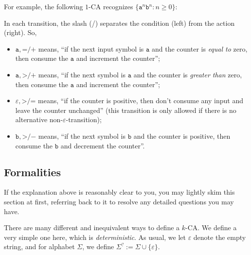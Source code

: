 \documentclass[11pt]{article}
\newcommand{\emptystr}{\varepsilon}
\renewcommand{\t}[1]{\texttt{#1}}
\newcommand{\syg}{\mathord{>}}
\newcommand{\sye}{\mathord{=}}
\newcommand{\syp}{\mathord{+}}
\newcommand{\sym}{\mathord{-}}
\theoremstyle{definition}
\begin{document}
For example, the following $1$-CA recognizes $\{\t a^n\t b^n : n\ge 0\}$:
\begin{center}
\end{center}
In each transition, the slash (/) separates the condition (left) from the action (right).  So,
\begin{itemize}
\item
$\t a,\sye/\syp$ means, ``if the next input symbol is $\t a$ and the counter is \emph{equal to} zero, then consume the $\t a$ and increment the counter'';
\item
$\t a,\syg/\syp$ means, ``if the next symbol is $\t a$ and the counter is \emph{greater than} zero, then consume the $\t a$ and increment the counter'';
\item
$\emptystr,\syg/\sye$ means, ``if the counter is positive, then don't consume any input and leave the counter unchanged'' (this transition is only allowed if there is no alternative non-$\emptystr$-transition);
\item
$\t b,\syg/\sym$ means, ``if the next symbol is $\t b$ and the counter is positive, then consume the $\t b$ and decrement the counter''.
\end{itemize}

\subsection{Formalities}

If the explanation above is reasonably clear to you, you may lightly skim this section at first, referring back to it to resolve any detailed questions you may have.

There are many different and inequivalent ways to define a $k$-CA\@.  We define a very simple one here, which is \emph{deterministic}.  As usual, we let $\emptystr$ denote the empty string, and for alphabet $\Sigma$, we define $\Sigma^? := \Sigma \cup \{\emptystr\}$.
\end{document}

